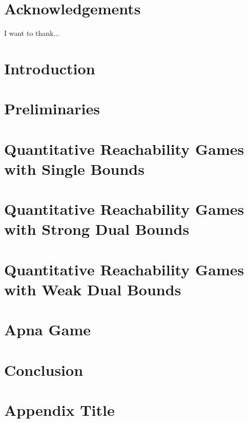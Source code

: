 \documentclass[a4paper,12pt, twoside]{book}
\theoremstyle{definition}
\begin{document}
\chapter*{Acknowledgements}
I want to thank...

\tableofcontents

\chapter{Introduction}

 
\chapter{Preliminaries}

 
\chapter{Quantitative Reachability Games with Single Bounds}

 
\chapter{Quantitative Reachability Games with Strong Dual Bounds}


\chapter{Quantitative Reachability Games with Weak Dual Bounds}

 
\chapter{Apna Game}


\chapter{Conclusion}





\appendix
\chapter{Appendix Title}

\end{document}
